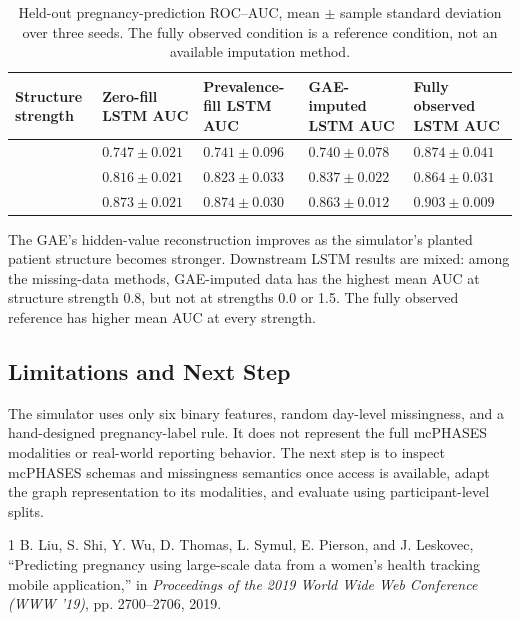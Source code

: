 \documentclass[11pt]{article}
\begin{document}
\begin{table}[htbp]
\centering
\small
\begin{tabular}{>{\centering\arraybackslash}p{1.35cm}
                >{\centering\arraybackslash}p{2.35cm}
                >{\centering\arraybackslash}p{2.35cm}
                >{\centering\arraybackslash}p{2.35cm}
                >{\centering\arraybackslash}p{2.35cm}}
\toprule
Structure strength &
Zero-fill LSTM AUC &
Prevalence-fill LSTM AUC &
GAE-imputed LSTM AUC &
Fully observed LSTM AUC \\
\midrule
0.0 & \(0.747 \pm 0.021\) & \(0.741 \pm 0.096\) &
\(0.740 \pm 0.078\) & \(0.874 \pm 0.041\) \\
0.8 & \(0.816 \pm 0.021\) & \(0.823 \pm 0.033\) &
\(0.837 \pm 0.022\) & \(0.864 \pm 0.031\) \\
1.5 & \(0.873 \pm 0.021\) & \(0.874 \pm 0.030\) &
\(0.863 \pm 0.012\) & \(0.903 \pm 0.009\) \\
\bottomrule
\end{tabular}
\caption{Held-out pregnancy-prediction ROC--AUC, mean \(\pm\) sample
standard deviation over three seeds. The fully observed condition is a
reference condition, not an available imputation method.}
\label{tab:lstm-results}
\end{table}

The GAE's hidden-value reconstruction improves as the simulator's planted
patient structure becomes stronger. Downstream LSTM results are mixed:
among the missing-data methods, GAE-imputed data has the highest mean AUC
at structure strength 0.8, but not at strengths 0.0 or 1.5. The fully
observed reference has higher mean AUC at every strength.

\subsection{Limitations and Next Step}

The simulator uses only six binary features, random day-level missingness,
and a hand-designed pregnancy-label rule. It does not represent the
full mcPHASES modalities or real-world reporting behavior. The next step
is to inspect mcPHASES schemas and missingness semantics once access is
available, adapt the graph representation to its modalities, and evaluate
using participant-level splits.

\begin{thebibliography}{1}
B. Liu, S. Shi, Y. Wu, D. Thomas, L. Symul, E. Pierson, and J. Leskovec,
``Predicting pregnancy using large-scale data from a women's health
tracking mobile application,''
in \emph{Proceedings of the 2019 World Wide Web Conference (WWW '19)},
pp. 2700--2706, 2019.
\end{thebibliography}
\end{document}
